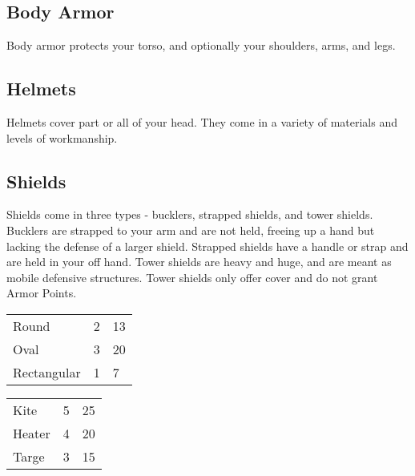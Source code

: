 \begin{multicols}{2}
\subsection{Body Armor}

Body armor protects your torso, and optionally your shoulders,
arms, and legs.

\subsection{Helmets}

Helmets cover part or all of your head. They come in a variety
of materials and levels of workmanship.

\subsection{Shields}

Shields come in three types - bucklers, strapped shields, and
tower shields. Bucklers are strapped to your arm and are not
held, freeing up a hand but lacking the defense of a larger
shield. Strapped shields have a handle or strap and are held
in your off hand. Tower shields are heavy and huge, and are
meant as mobile defensive structures. Tower shields only offer
cover and do not grant Armor Points.

\begin{center}
{
\begin{xtabular}{|l|l|l|}
Round & 2 & 13 \\
Oval & 3 & 20 \\
Rectangular & 1 & 7 \\
\hline
\end{xtabular}
}
\end{center}

\begin{center}
{
\begin{xtabular}{|l|l|l|}
Kite & 5 & 25 \\
Heater & 4 & 20 \\
Targe & 3 & 15 \\
\hline
\end{xtabular}
}
\end{center}


\end{multicols}
